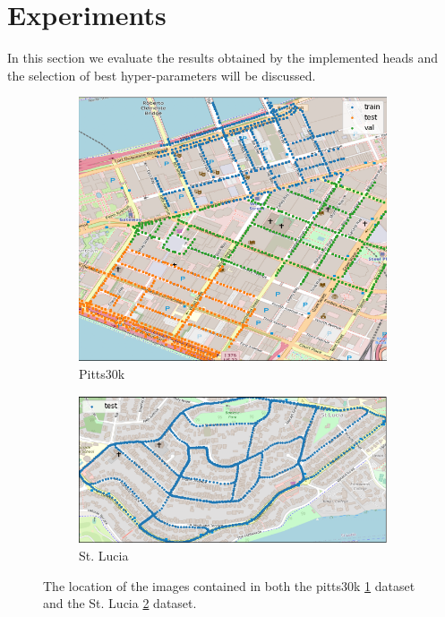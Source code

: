 \documentclass[10pt,twocolumn,letterpaper]{article}
\begin{document}
\section{Experiments}
In this section we evaluate the results obtained by the implemented heads and the selection of best hyper-parameters will be discussed.

\begin{figure}
   \centering
   \begin{subfigure}[b]{0.23\textwidth}
      \centering
      \includegraphics[width=\textwidth]{img/pitts_out.png}
      \caption{Pitts30k}
      \label{fig:datasets:pitts30k}
   \end{subfigure}
   \hfill
   \begin{subfigure}[b]{0.23\textwidth}
      \centering
      \includegraphics[width=\textwidth]{img/st_lucia_out.png}
      \begin{minipage}{1cm}
         \vfill
      \end{minipage}
      \vspace{0.2cm}
      \caption{St. Lucia}
      \label{fig:datasets:st_lucia}
   \end{subfigure}
   \caption{The location of the images contained in both the pitts30k \ref{fig:datasets:pitts30k} dataset and the St. Lucia \ref{fig:datasets:st_lucia} dataset.}
   \label{fig:datasets}
\end{figure}
\end{document}
